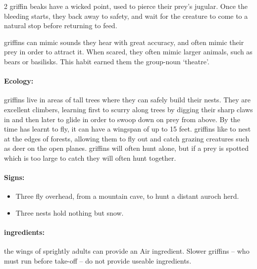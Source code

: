 \begin{multicols}{2}
\Gls{griffin} beaks have a wicked point, used to pierce their prey's jugular.
Once the bleeding starts, they back away to safety, and wait for the creature to come to a natural stop before returning to feed.

\Glspl{griffin} can mimic sounds they hear with great accuracy, and often mimic their prey in order to attract it.
When scared, they often mimic larger animals, such as bears or \glspl{basilisk}.
This habit earned them the group-noun `theatre'.


\paragraph{Ecology:} \Glspl{griffin} live in areas of tall trees where they can safely build their nests.
They are excellent climbers, learning first to scurry along trees by digging their sharp claws in and then later to glide in order to swoop down on prey from above.
By the time  has learnt to fly, it can have a wingspan of up to 15 feet.
\Glspl{griffin} like to nest at the edges of forests, allowing them to fly out and catch grazing creatures such as deer on the open planes.
\Glspl{griffin} will often hunt alone, but if a prey is spotted which is too large to catch  they will often hunt together.


\paragraph{Signs:}

\begin{itemize}
  \item
  Three fly overhead, from a mountain cave, to hunt a distant auroch herd.
  \item
  Three nests hold nothing but snow.
\end{itemize}

\paragraph{\Glspl{ingredient}:}
the wings of sprightly adults can provide an Air \gls{ingredient}.
Slower \glspl{griffin} -- who must run before take-off -- do not provide useable \glspl{ingredient}.

\showEnc


\end{multicols}
